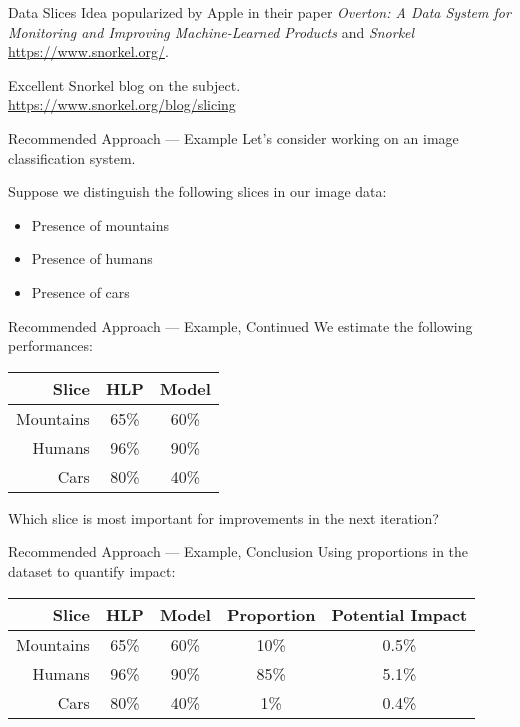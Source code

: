 \begin{frame}{Data Slices}
  Idea popularized by Apple in their paper \textit{Overton: A Data System for Monitoring and Improving Machine-Learned Products}
  and \textit{Snorkel} \url{https://www.snorkel.org/}.

  {Excellent Snorkel blog} on the subject.\\
  \url{https://www.snorkel.org/blog/slicing}

  \hugo
\end{frame}


\begin{frame}{Recommended Approach — Example}
  Let's consider working on an image classification system.

  Suppose we distinguish the following slices in our image data:

  \begin{itemize}
    \item Presence of mountains
    \item Presence of humans
    \item Presence of cars
  \end{itemize}

  \hugo
\end{frame}


\begin{frame}{Recommended Approach — Example, Continued}
  We estimate the following performances:

  \begin{tabular}{rcc}
    \hline
    Slice      & HLP  & Model \\
    \hline
    Mountains  & 65\% & 60\%  \\
    Humans     & 96\% & 90\%  \\
    Cars       & 80\% & 40\%  \\
    \hline
  \end{tabular}

  Which slice is most important for improvements in the next iteration?

  \hugo
\end{frame}


\begin{frame}{Recommended Approach — Example, Conclusion}
  Using proportions in the dataset to quantify impact:

  \begin{tabular}{rcccc}
    \hline
    Slice      & HLP  & Model & Proportion & Potential Impact \\
    \hline
    Mountains  & 65\% & 60\%  & 10\%       & 0.5\% \\
    Humans     & 96\% & 90\%  & 85\%       & 5.1\% \\
    Cars       & 80\% & 40\%  & 1\%        & 0.4\% \\
    \hline
  \end{tabular}

  \hugo
\end{frame}


